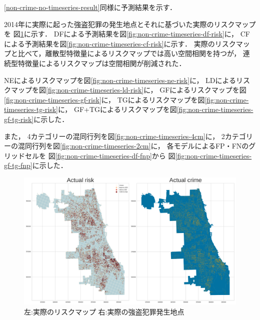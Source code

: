
\ref{non-crime-no-timeseries-result}同様に予測結果を示す．

2014年に実際に起った強盗犯罪の発生地点とそれに基づいた実際のリスクマップを
図\ref{fig:non-crime-timeseries-actual-risk}に示す．
DFによる予測結果を図\ref{fig:non-crime-timeseries-df-risk}に，
CFによる予測結果を図\ref{fig:non-crime-timeseries-cf-risk}に示す．
実際のリスクマップと比べて，離散型特徴量によるリスクマップでは高い空間相関を持つが，
連続型特徴量によるリスクマップは空間相関が削減された．

NEによるリスクマップを図\ref{fig:non-crime-timeseries-ne-risk}に，
LDによるリスクマップを図\ref{fig:non-crime-timeseries-ld-risk}に，
GFによるリスクマップを図\ref{fig:non-crime-timeseries-gf-risk}に，
TGによるリスクマップを図\ref{fig:non-crime-timeseries-tg-risk}に，
GF+TGによるリスクマップを図\ref{fig:non-crime-timeseries-gf-tg-risk}に示した．


また，
4カテゴリーの混同行列を図\ref{fig:non-crime-timeseries-4cm}に，
2カテゴリーの混同行列を図\ref{fig:non-crime-timeseries-2cm}に，
各モデルによるFP・FNのグリッドセルを
図\ref{fig:non-crime-timeseries-df-fnp}から
図\ref{fig:non-crime-timeseries-gf-tg-fnp}に示した．

\begin{figure}
  \centering %
  \includegraphics[scale=0.25]{./util-fig/actual_risk_point_map.png}
  \caption{左:実際のリスクマップ 右:実際の強盗犯罪発生地点}
  \label{fig:non-crime-timeseries-actual-risk}
\end{figure}

